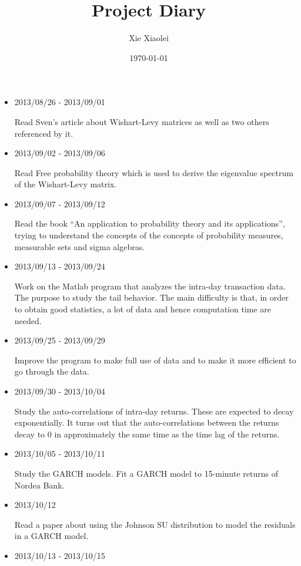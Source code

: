 \documentclass{article}
\title{Project Diary}
\author{Xie Xiaolei}
\date{\today}
\begin{document}
\maketitle

\begin{itemize}
\item 2013/08/26 - 2013/09/01

Read Sven's article about Wishart-Levy matrices as well as two
others referenced by it.

\item 2013/09/02 - 2013/09/06

Read Free probability theory which is used to derive the eigenvalue
spectrum of the Wishart-Levy matrix.

\item 2013/09/07 - 2013/09/12

Read the book ``An application to probability theory and its
applications'', trying to understand the concepts of the concepts of
probability measures, measurable sets and sigma algebras.

\item 2013/09/13 - 2013/09/24

Work on the Matlab program that analyzes the intra-day transaction
data. The purpose to study the tail behavior. The main difficulty is
that, in order to obtain good statistics, a lot of data and hence
computation time are needed.

\item 2013/09/25 - 2013/09/29

Improve the program to make full use of data and to make it more
efficient to go through the data.

\item 2013/09/30 - 2013/10/04

Study the auto-correlations of intra-day returns. These are expected to
decay exponentially. It turns out that the auto-correlations between
the returns decay to 0 in approximately the same time as the time lag
of the returns.

\item 2013/10/05 - 2013/10/11

Study the GARCH models. Fit a GARCH model to 15-minute returns of
Nordea Bank.

\item 2013/10/12

Read a paper about using the Johnson SU distribution to model the
residuals in a GARCH model.

\item 2013/10/13 - 2013/10/15


\end{itemize}
\end{document}
